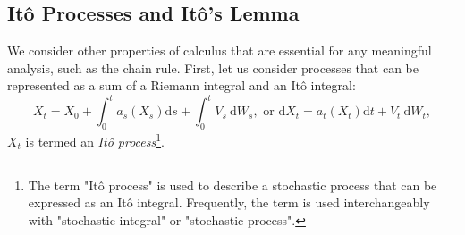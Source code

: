 


\subsection{Itô Processes and Itô's Lemma}
We consider other properties of calculus that are essential for any meaningful analysis, such as the chain rule. First, let us consider processes that can be represented as a sum of a Riemann integral and an Itô integral:
\[
    X_t=X_0+\int_0^t a_s\left(X_s\right) \mathrm{d} s+\int_0^t V_s \mathrm{~d} W_s, \text{ or } \mathrm{d} X_t=a_t\left(X_t\right) \mathrm{d} t+V_t \mathrm{~d} W_t, \label{eq:ito_process}
\]
$X_t$ is termed an \textit{Itô process}\footnote{The term "Itô process" is used to describe a stochastic process that can be expressed as an Itô integral. Frequently, the term is used interchangeably with "stochastic integral" or "stochastic process".}.

